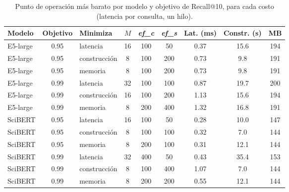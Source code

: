 \begin{table}[tbp]
\caption{Punto de operación más barato por modelo y objetivo de Recall@10, para cada costo (latencia por consulta, un hilo).}\label{tab:seleccion}
\centering
\small
\begin{tabular}{|l|c|l|c|c|c|c|c|c|}
\hline
\textbf{Modelo} & \textbf{Objetivo} & \textbf{Minimiza} & \textbf{$M$} & \textbf{\textit{ef\_c}} & \textbf{\textit{ef\_s}} & \textbf{Lat. (ms)} & \textbf{Constr. (s)} & \textbf{MB} \\
\hline
E5-large & 0.95 & latencia & 16 & 100 & 50 & 0.37 & 15.6 & 194 \\
E5-large & 0.95 & construcción & 8 & 100 & 200 & 0.73 & 9.8 & 191 \\
E5-large & 0.95 & memoria & 8 & 100 & 200 & 0.73 & 9.8 & 191 \\
E5-large & 0.99 & latencia & 32 & 100 & 100 & 0.87 & 19.7 & 200 \\
E5-large & 0.99 & construcción & 16 & 100 & 200 & 1.13 & 15.6 & 194 \\
E5-large & 0.99 & memoria & 8 & 200 & 400 & 1.32 & 16.8 & 191 \\
SciBERT & 0.95 & latencia & 16 & 100 & 50 & 0.28 & 10.0 & 147 \\
SciBERT & 0.95 & construcción & 8 & 100 & 100 & 0.32 & 7.0 & 144 \\
SciBERT & 0.95 & memoria & 8 & 200 & 100 & 0.31 & 12.1 & 144 \\
SciBERT & 0.99 & latencia & 32 & 400 & 50 & 0.43 & 35.4 & 153 \\
SciBERT & 0.99 & construcción & 8 & 100 & 400 & 1.07 & 7.0 & 144 \\
SciBERT & 0.99 & memoria & 8 & 200 & 200 & 0.55 & 12.1 & 144 \\
\hline
\end{tabular}
\end{table}
